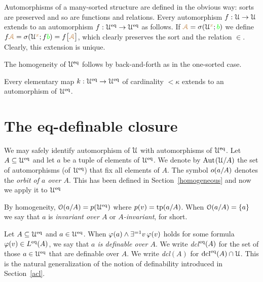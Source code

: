 Automorphisms of a many-sorted structure are defined in the obvious way: sorts are preserved and so are functions and relations.
Every automorphism $f:\EuScript U\rightarrow\EuScript U$ extends to an automorphism $f:\EuScript U^{{\rm eq}}\rightarrow\EuScript U^{{\rm eq}}$ as follows.
If ${\color{brown}\EuScript A}=\sigma(\EuScript U^{\color{brown} x};{\color{green} b})$ we define $f{\color{brown}\EuScript A}=\sigma(\EuScript U^{\color{brown} x};f{\color{green} b})=f\big[{\color{brown}\EuScript A}\big]$, which clearly preserves the sort and the relation $\in$.
Clearly, this extension is unique.

The homogeneity of $\EuScript U^{{\rm eq}}$ follows by back-and-forth as in the one-sorted case.

\begin{proposition}\label{prop_Ueq_homogeneous}
Every elementary map $k:\EuScript U^{{\rm eq}}\to\EuScript U^{{\rm eq}}$ of cardinality $<\kappa$ extends to an automorphism of $\EuScript U^{{\rm eq}}$.
\end{proposition} 

\section{The eq-definable closure}
We may safely identify automorphism of $\EuScript U$ with automorphisms of $\EuScript U^{{\rm eq}}$.
Let $A\subseteq\EuScript U^{{\rm eq}}$ and let $a$ be a tuple of elements of $\EuScript U^{{{\rm eq}}}$.
We denote by \emph{${\rm Aut\kern.15ex}(\EuScript U/A)$\/} the set of automorphisms (of $\EuScript U^{{\rm eq}}$) that fix all elements of $A$.
The symbol \emph{$o(a/A)$\/} denotes the \emph{orbit of $a$ over $A$}.
This has been defined in Section~\ref{homogeneous} and now we apply it to $\EuScript U^{{\rm eq}}$


By homogeneity, $\EuScript O(a/A)=p(\EuScript U^{{\rm eq}})$ where $p(v)={\rm tp}(a/A)$.
When $\EuScript O(a/A)=\{a\}$ we say that $a$ is \emph{invariant over $A$\/} or \emph{$A$-invariant}, for short.


\begin{definition}\label{def_def}
Let $A\subseteq\EuScript U^{{\rm eq}}$ and $a\in\EuScript U^{{\rm eq}}$.
When $\varphi(a)\wedge\exists^{=1}v\,\varphi(v)$ holds for some formula $\varphi(v)\in L^{{\rm eq}}(A)$, we say that \emph{$a$ is definable over $A$}.
We write \emph{\rm dcl$^{\rm eq}(A)$\/} for the set of those $a\in\EuScript U^{{\rm eq}}$ that are definable over $A$.
We write \emph{\rm dcl$(A)$\/} for ${\rm dcl}^{{\rm eq}}(A)\cap\EuScript U$.
This is the natural generalization of the notion of definability introduced in Section~\ref{acl}.
\end{definition}

